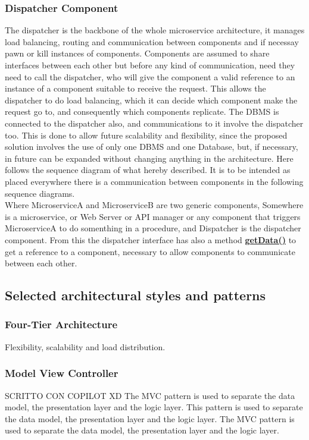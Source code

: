 \subsubsection{Dispatcher Component} \label{parr:dispatcher}
The dispatcher is the backbone of the whole microservice architecture, it manages load balancing, routing and communication between components and if necessay pawn or kill instances of components. 
Components are assumed to share interfaces between each other but before any kind of communication, need they need to call the dispatcher, who will give the component a valid reference to an instance of a component suitable to receive the request.
This allows the dispatcher to do load balancing, which it can decide which component make the request go to, and consequently which components replicate.
The DBMS is connected to the dispatcher also, and communications to it involve the dispatcher too. 
This is done to allow future scalability and flexibility, since the proposed solution involves the use of only one DBMS and one Database, but, if necessary, in future can be expanded without changing anything in the architecture.
Here follows the sequence diagram of what hereby described. It is to be intended as placed everywhere there is a communication between components in the following sequence diagrams.\\
Where MicroserviceA and MicroserviceB are two generic components, Somewhere is a microservice, or Web Server or API manager or any component that triggers MicroserviceA to do somenthing in a procedure, and Dispatcher is the dispatcher component.
From this the dispatcher interface has also a method \hyperref[meth:dispGetData]{\textbf{getData()}} to get a reference to a component, necessary to allow components to communicate between each other.\\


\subsection{Selected architectural styles and patterns}
\subsubsection{Four-Tier Architecture}
Flexibility, scalability and load distribution.
\subsubsection{Model View Controller}
SCRITTO CON COPILOT XD
The MVC pattern is used to separate the data model, the presentation layer and the logic layer. This pattern is used to separate the data model, the presentation layer and the logic layer. The MVC pattern is used to separate the data model, the presentation layer and the logic layer.
